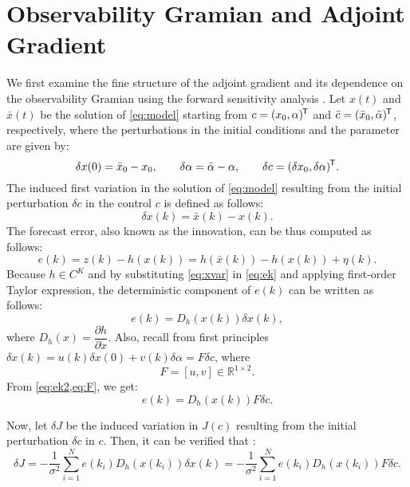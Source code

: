 \documentclass{article}
\newcommand*{\tran}{^{\mkern-1.5mu\mathsf{T}}}
\begin{document}
\section{Observability Gramian and Adjoint Gradient} \label{sec:gram}
We first examine the fine structure of the adjoint gradient and its dependence on the observability Gramian using the forward sensitivity analysis \cite{lakshmivarahan2020controlling,lakshmivarahan2022observability}. Let $x(t)$ and $\bar{x}(t)$ be the solution of \cref{eq:model} starting from $c=(x_0,\alpha)\tran$ and \textcolor{rev}{$\bar{c}=(\bar{x}_0,\bar{\alpha})\tran$}, respectively, where the perturbations in the initial conditions and the parameter are given by:
\begin{equation}
    \delta x(0) = \bar{x}_0 - x_0, \qquad \delta \alpha = \bar{\alpha} - \alpha, \qquad  \delta c = (\delta x_0, \delta \alpha)\tran.
\end{equation}
The induced first variation in the solution of \cref{eq:model} resulting from the initial perturbation $\delta c$ in the control $c$ is defined as follows:
\begin{equation}
    \delta x(k) = \bar{x}(k) - x(k). \label{eq:xvar}
\end{equation}
The forecast error, also known as the innovation, can be thus computed as follows:
\begin{equation}
    e(k) = z(k) - h(x(k)) = h(\bar{x}(k)) - h(x(k)) + \eta(k). \label{eq:ek}
\end{equation}
Because $h \in C^K$ and by substituting \cref{eq:xvar} in \cref{eq:ek} and applying first-order Taylor expression, the deterministic component of $e(k)$ can be written as follows:
\begin{equation}
    e(k) = D_h(x(k)) \delta x(k), \label{eq:ek2}
\end{equation}
where $D_h(x) = \dfrac{\partial h}{\partial x}$. Also, recall from first principles $\delta x(k) = u(k) \delta x(0) + v(k) \delta \alpha = F \delta c$, where
\begin{equation}
    F = [u,v] \in \mathbb{R}^{1\times 2}. \label{eq:F}
\end{equation}
From \cref{eq:ek2,eq:F}, we get:
\begin{equation}
    e(k) = D_h(x(k)) F \delta c. \label{eq:ek3}
\end{equation}

Now, let $\delta J$ be the induced variation in $J(c)$ resulting from the initial perturbation $\delta c$ in $c$. Then, it can be verified that \cite{lewis2006dynamic}:
\begin{equation}
    \delta J = -\dfrac{1}{\sigma^2} \sum_{i=1}^{N} e(k_i) D_h(x(k_i)) \delta x(k) = -\dfrac{1}{\sigma^2} \sum_{i=1}^{N} e(k_i) D_h(x(k_i)) F \delta c. \label{eq:dJ}
\end{equation}
\end{document}
